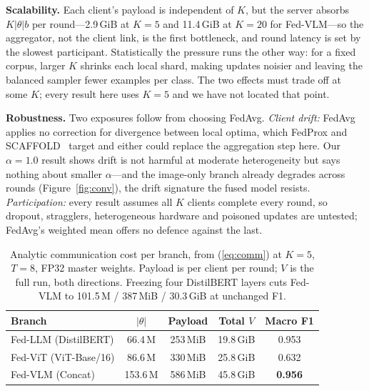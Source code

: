 \documentclass[letterpaper, conference]{IEEEtran}
\begin{document}
\textbf{Scalability.} Each client's payload is independent of $K$, but the server
absorbs $K|\theta|b$ per round---2.9\,GiB at $K{=}5$ and 11.4\,GiB at $K{=}20$ for
Fed-VLM---so the aggregator, not the client link, is the first bottleneck, and
round latency is set by the slowest participant. Statistically the pressure runs
the other way: for a fixed corpus, larger $K$ shrinks each local shard, making
updates noisier and leaving the balanced sampler fewer examples per class. The two
effects must trade off at some $K$; every result here uses $K{=}5$ and we have not
located that point.

\textbf{Robustness.} Two exposures follow from choosing FedAvg. \emph{Client
drift:} FedAvg applies no correction for divergence between local optima, which
FedProx and SCAFFOLD~\cite{Karimireddy2020} target and either could replace the
aggregation step here. Our $\alpha{=}1.0$ result shows drift is not harmful at
moderate heterogeneity but says nothing about smaller $\alpha$---and the
image-only branch already degrades across rounds (Figure~\ref{fig:conv}), the
drift signature the fused model resists. \emph{Participation:} every result
assumes all $K$ clients complete every round, so dropout, stragglers,
heterogeneous hardware and poisoned updates are untested; FedAvg's weighted mean
offers no defence against the last.

\begin{table}[t]
\caption{Analytic communication cost per branch, from (\ref{eq:comm}) at $K{=}5$, $T{=}8$, FP32 master weights. Payload is per client per round; $V$ is the full run, both directions. Freezing four DistilBERT layers cuts Fed-VLM to 101.5\,M / 387\,MiB / 30.3\,GiB at unchanged F1.}
\label{tab:comm}
\centering\footnotesize
\setlength\tabcolsep{4pt}
\begin{tabular}{lcccc}
\toprule
\textbf{Branch} & $|\theta|$ & \textbf{Payload} & \textbf{Total $V$} & \textbf{Macro F1}\\
\midrule
Fed-LLM (DistilBERT)  & 66.4\,M  & 253\,MiB & 19.8\,GiB & 0.953 \\
Fed-ViT (ViT-Base/16) & 86.6\,M  & 330\,MiB & 25.8\,GiB & 0.632 \\
Fed-VLM (Concat)      & 153.6\,M & 586\,MiB & 45.8\,GiB & \textbf{0.956} \\
\bottomrule
\end{tabular}
\end{table}
\end{document}
